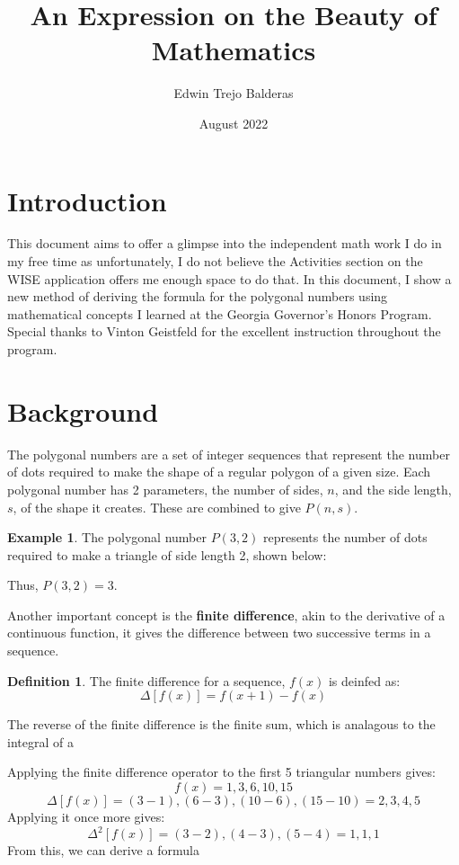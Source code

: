 \documentclass[12pt, letterpaper]{article}
\title{An Expression on the Beauty of Mathematics}
\author{Edwin Trejo Balderas}
\date{August 2022}
\newcommand{\forceindent}{\leavevmode{\parindent=1em\indent}}
\theoremstyle{definition}
\newtheorem{definition}{Definition}
\theoremstyle{definition}
\newtheorem{exmp}{Example}
\begin{document}
\maketitle

\section{Introduction}
\forceindent This document aims to offer a glimpse into the independent math work I do in my free time as unfortunately, I do not believe the Activities section on the WISE application offers me enough space to do that.
In this document, I show a new method of deriving the formula for the polygonal numbers using mathematical concepts I learned at the Georgia Governor's Honors Program. Special thanks to Vinton Geistfeld for the excellent instruction throughout the program.


\section{Background}
\forceindent The polygonal numbers are a set of integer sequences that represent the number of dots required to make the shape of a regular polygon of a given size. 
Each polygonal number has 2 parameters, the number of sides, \(n\), and the side length, \(s\), of the shape it creates. These are combined to give \(P(n,s)\).


\begin{exmp}
    The polygonal number \(P(3,2)\) represents the number of dots required to make a triangle of side length 2, shown below:
    \begin{figure}[h]
        \centering
        \label{A Visual Representation of the Polygonal Number P(3,2)}
    \end{figure}
\newline Thus, \(P(3,2) = 3\).
\end{exmp}

\forceindent Another important concept is the \textbf{finite difference}, akin to the derivative of a continuous function, it gives the difference between two successive terms in a sequence.

\begin{definition}
The finite difference for a sequence, \(f(x)\) is deinfed as:
\[\Delta[f(x)] = f(x+1) - f(x)\]
\end{definition}

\forceindent The reverse of the finite difference is the finite sum, which is analagous to the integral of a 

Applying the finite difference operator to the first 5 triangular numbers gives:
\[f(x) = 1,3,6,10,15\]
\[\Delta[f(x)] = (3-1), (6-3), (10-6), (15-10) = 2,3,4,5\]
Applying it once more gives: 
\[\Delta^2[f(x)] = (3-2),(4-3),(5-4) = 1,1,1\]
From this, we can derive a formula 
\end{document}

